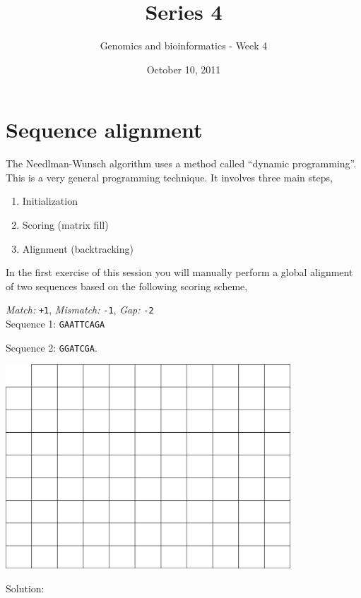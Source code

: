 \documentclass[a4paper,11pt]{article}
\title{Series 4}
\date{October 10, 2011}
\author{Genomics and bioinformatics - Week 4}
\begin{document}
\maketitle

\section{Sequence alignment}
The Needlman-Wunsch algorithm uses a method called ``dynamic programming''. This is a very general programming technique. It involves three main steps,
\begin{enumerate}
\item Initialization
\item Scoring (matrix fill)
\item Alignment (backtracking)
\end{enumerate}

In the first exercise of this session you will manually perform a global alignment of two sequences based on the following scoring scheme,

\emph{Match:}  \texttt{+1}, \emph{Mismatch:} \texttt{-1}, \emph{Gap:} \texttt{-2}\\

Sequence 1: \texttt{GAATTCAGA}

Sequence 2: \texttt{GGATCGA}.

\begin{center}
\includegraphics[width=0.8\textwidth]{matrix.png}
\end{center}

Solution:
\end{document}
